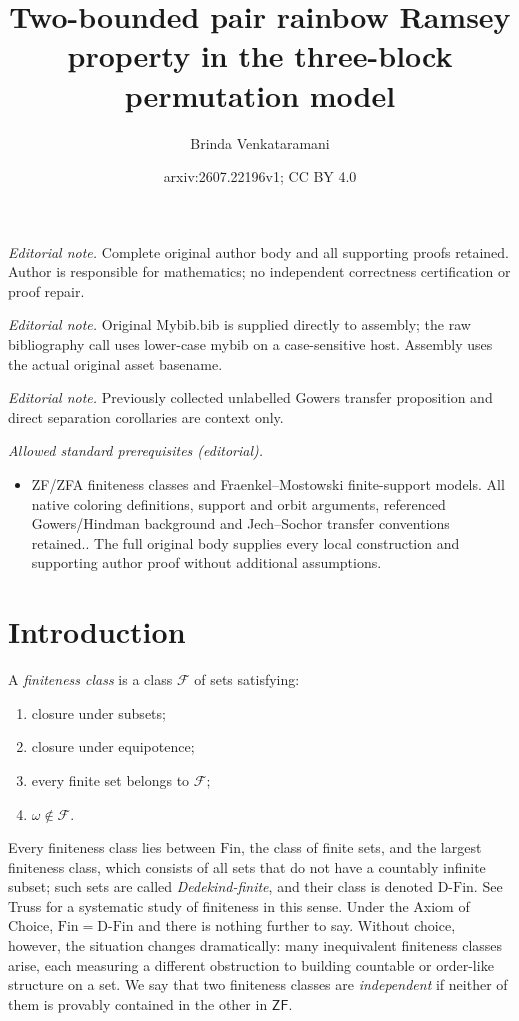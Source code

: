 \documentclass[10pt,a4paper]{amsart}
\title{Two-bounded pair rainbow Ramsey property in the three-block permutation model}
\author{Brinda Venkataramani}
\date{arxiv:2607.22196v1; CC BY 4.0}
\theoremstyle{definition}
\newcommand{\ZF}{\mathsf{ZF}}
\newcommand{\Fin}{\mathrm{Fin}}
\newcommand{\DFin}{\mathrm{D\text{-}Fin}}
\begin{document}
\maketitle
\noindent\textit{Editorial note.} Complete original author body and all supporting proofs retained. Author is responsible for mathematics; no independent correctness certification or proof repair.\par\medskip
\noindent\textit{Editorial note.} Original Mybib.bib is supplied directly to assembly; the raw bibliography call uses lower-case mybib on a case-sensitive host. Assembly uses the actual original asset basename.\par\medskip
\noindent\textit{Editorial note.} Previously collected unlabelled Gowers transfer proposition and direct separation corollaries are context only.\par\medskip
\noindent\textit{Allowed standard prerequisites (editorial).}\begin{itemize}
\item ZF/ZFA finiteness classes and Fraenkel--Mostowski finite-support models. All native coloring definitions, support and orbit arguments, referenced Gowers/Hindman background and Jech--Sochor transfer conventions retained.. The full original body supplies every local construction and supporting author proof without additional assumptions.
\end{itemize}\medskip
\section{Introduction}

A \emph{finiteness class} is a class \(\mathcal F\) of sets satisfying:
\begin{enumerate}[label=(\roman*)]
    \item closure under subsets;
    \item closure under equipotence;
    \item every finite set belongs to \(\mathcal F\);
    \item \(\omega\notin \mathcal F\).
\end{enumerate}
Every finiteness class lies between \(\Fin\), the class of finite sets, and the largest finiteness class, which consists of all sets that do not have a countably infinite subset; such sets are called \emph{Dedekind-finite}, and their class is denoted \(\DFin\).  See Truss \cite{TrussFiniteness} for a systematic study of finiteness in this sense.  Under the Axiom of Choice, \(\Fin=\DFin\) and there is nothing further to say.  Without choice, however, the situation changes dramatically: many inequivalent finiteness classes arise, each measuring a different obstruction to building countable or order-like structure on a set.  We say that two finiteness classes are \emph{independent} if neither of them is provably contained in the other in \(\ZF\).
\end{document}
